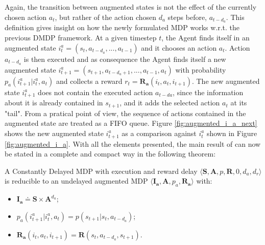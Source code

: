                 Again, the transition between augmented states is not the effect of the currently chosen action $a_t$, but rather of the action chosen $d_{a}$ steps before, $a_{t-d_{a}}$. This definition gives insight on how the newly formulated MDP works w.r.t. the previous DMDP framework. At a given timestep $t$, the Agent finds itself in an augmented state $i_t^{a} = \left( s_t, a_{t-d_{a}}, ..., a_{t-1} \right)$ and it chooses an action $a_t$. Action $a_{t-d_{a}}$ is then executed and as consequence  the Agent finds itself a new augmented state $i_{t+1}^{a} = \left( s_{t+1}, a_{t-d_{a}+1}, ..., a_{t-1}, a_{t} \right)$ with probability $p_a \left( i_{t+1}^a | i_t^a , a_t  \right)$ and collects a reward $r_t = \mathbf{R_{a}}\left( i_t, a_{t}, i_{t+1} \right)$. The new augmented state $i_{t+1}^{a}$ does not contain the executed action $a_{t-d{a}}$, since the information about it is already contained in $s_{t+1}$, and it adds the selected action $a_t$ at its "tail". From a pratical point of view, the sequence of actions contained in the augmented state are treated as a FIFO queue. Figure \ref{fig:augmented_i_a_next} shows the new augmented state $i_{t+1}^{a}$ as a comparison against $i_t^{a}$ shown in Figure \ref{fig:augmented_i_a}.
                With all the elements presented, the main result of  can now be stated in a complete and compact way in the following theorem:
            
                \begin{theorem}
                    \label{th:dmdpexecred}
                    A Constantly Delayed MDP with execution and reward delay $\langle \mathbf{S}, \mathbf{A}, p, \mathbf{R}, 0, d_a, d_r \rangle$ is reducible to an undelayed augmented MDP $\langle \mathbf{I_a}, \mathbf{A}, p_a, \mathbf{R_a} \rangle$ with: 
                    \begin{itemize}[topsep=0.5em, partopsep=0.5em]
                        \setlength\itemsep{0em}
                        \item $\mathbf{I_{a}} \doteq \mathbf{S} \times \mathbf{A}^{d_a}$;
                        \item $p_a \left( i_{t+1}^a | i_t^a , a_t  \right) = p \left( s_{t+1} | s_t, a_{t-d_{a}} \right)$;
                        \item $\mathbf{R_{a}}\left( i_t, a_{t}, i_{t+1} \right) = \mathbf{R} \left( s_t, a_{t-d_{a}}, s_{t+1} \right)$.
                    \end{itemize}
                \end{theorem}
                
